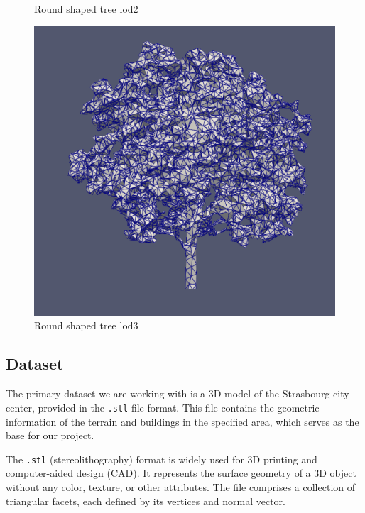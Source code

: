 \documentclass[12pt]{article}
\begin{document}
\begin{figure}[H]
\begin{minipage}{0.30\textwidth}
        \caption{Round shaped tree lod2}
    \end{minipage}
    \begin{minipage}{0.30\textwidth}
        \centering
        \includegraphics[width=1\textwidth]{images/tree-round_lod3.png}
        \caption{Round shaped tree lod3}
    \end{minipage}
\end{figure}








\subsection{Dataset}

The primary dataset we are working with is a 3D model of the Strasbourg city
center, provided in the \texttt{.stl} file format. This file contains the
geometric information of the terrain and buildings in the specified area,
which serves as the base for our project.

The \texttt{.stl} (stereolithography) format is widely used for 3D printing
and computer-aided design (CAD). It represents the surface geometry of a 3D
object without any color, texture, or other attributes. The file comprises a
collection of triangular facets, each defined by its vertices and normal vector.
\end{document}
